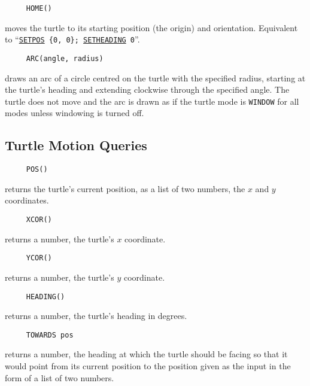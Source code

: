 \begin{verbatim}
     HOME()
\end{verbatim}
\label{logoturtle:home}
moves the turtle to its starting position (the origin) and orientation.
Equivalent to ``\texttt{\hyperref[logoturtle:setpos]{SETPOS}~\{0,~0\};
  \hyperref[logoturtle:setheading]{SETHEADING}~0}''.

\begin{verbatim}
     ARC(angle, radius)
\end{verbatim}
draws an arc of a circle centred on the turtle with the specified
radius, starting at the turtle's heading and extending clockwise
through the specified angle.  The turtle does not move and the arc is
drawn as if the turtle mode is \texttt{WINDOW} for all modes unless
windowing is turned off.


\subsection{Turtle Motion Queries}

\begin{verbatim}
     POS()
\end{verbatim}
returns the turtle's current position, as a list of two numbers, the
$x$ and $y$ coordinates.

\begin{verbatim}
     XCOR()
\end{verbatim}
returns a number, the turtle's $x$ coordinate.

\begin{verbatim}
     YCOR()
\end{verbatim}
returns a number, the turtle's $y$ coordinate.

\begin{verbatim}
     HEADING()
\end{verbatim}
returns a number, the turtle's heading in degrees.

\begin{verbatim}
     TOWARDS pos
\end{verbatim}
returns a number, the heading at which the turtle should be facing so
that it would point from its current position to the position given as
the input in the form of a list of two numbers.


